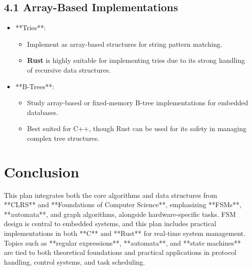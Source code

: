 \documentclass{article}
\begin{document}
\subsection*{4.1 Array-Based Implementations}
\begin{itemize}
    \item **Tries**:
    \begin{itemize}
        \item Implement as array-based structures for string pattern matching.
        \item \textbf{Rust} is highly suitable for implementing tries due to its strong handling of recursive data structures.
    \end{itemize}
    \item **B-Trees**:
    \begin{itemize}
        \item Study array-based or fixed-memory B-tree implementations for embedded databases.
        \item Best suited for C++, though Rust can be used for its safety in managing complex tree structures.
    \end{itemize}
\end{itemize}

\section*{Conclusion}
This plan integrates both the core algorithms and data structures from **CLRS** and **Foundations of Computer Science**, emphasizing **FSMs**, **automata**, and graph algorithms, alongside hardware-specific tasks. FSM design is central to embedded systems, and this plan includes practical implementations in both **C** and **Rust** for real-time system management. Topics such as **regular expressions**, **automata**, and **state machines** are tied to both theoretical foundations and practical applications in protocol handling, control systems, and task scheduling.
\end{document}
